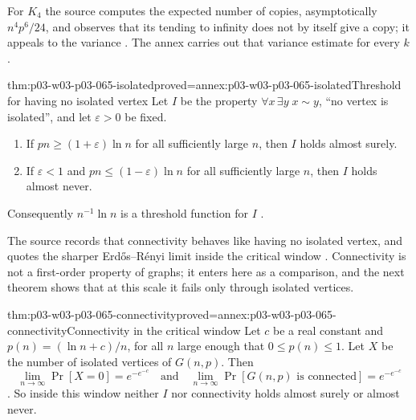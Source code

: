 For \(K_4\) the source computes the expected number of copies,
asymptotically \(n^4p^6/24\), and observes that its tending to infinity does
not by itself give a copy; it appeals to the variance
\cite[p.~4]{Spencer2007LogicRandomStructuresAuthor}.  The annex carries out that variance
estimate for every \(k\).

\begin{hbtheorem}{thm:p03-w03-p03-065-isolated}{proved=annex:p03-w03-p03-065-isolated}{Threshold for having no isolated vertex}
Let \(I\) be the property \(\forall x\,\exists y\;x\sim y\), ``no vertex is
isolated'', and let \(\varepsilon>0\) be fixed.
\begin{enumerate}
\item If \(pn\geq(1+\varepsilon)\ln n\) for all sufficiently large \(n\),
then \(I\) holds almost surely.
\item If \(\varepsilon<1\) and \(pn\leq(1-\varepsilon)\ln n\) for all
sufficiently large \(n\), then \(I\) holds almost never.
\end{enumerate}
Consequently \(n^{-1}\ln n\) is a threshold function for \(I\)
\cite[p.~5]{Spencer2007LogicRandomStructuresAuthor}.
\end{hbtheorem}

The source records that connectivity behaves like having no isolated vertex,
and quotes the sharper Erd\H{o}s--R\'enyi limit inside the critical window
\cite[p.~5]{Spencer2007LogicRandomStructuresAuthor}.  Connectivity is not a
first-order property of graphs; it enters here as a comparison, and the next
theorem shows that at this scale it fails only through isolated vertices.

\begin{hbtheorem}{thm:p03-w03-p03-065-connectivity}{proved=annex:p03-w03-p03-065-connectivity}{Connectivity in the critical window}
Let \(c\) be a real constant and \(p(n)=(\ln n+c)/n\), for all \(n\) large
enough that \(0\leq p(n)\leq1\).  Let \(X\) be the number of isolated
vertices of \(G(n,p)\).  Then
\[
  \lim_{n\to\infty}\Pr[X=0]=e^{-e^{-c}}
  \quad\text{and}\quad
  \lim_{n\to\infty}\Pr[G(n,p)\text{ is connected}]=e^{-e^{-c}}
\]
\cite[p.~5]{Spencer2007LogicRandomStructuresAuthor}.  So inside this window
neither \(I\) nor connectivity holds almost surely or almost never.
\end{hbtheorem}

